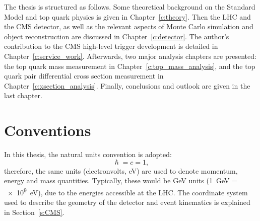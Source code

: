 The thesis is structured as follows. Some theoretical background on the Standard Model and top quark physics is given in
Chapter~\ref{c:theory}. Then the LHC and the CMS detector, as well as the relevant aspects of Monte Carlo simulation and
object reconstruction are discussed in Chapter~\ref{c:detector}. The author's contribution to the CMS high-level
trigger development is detailed in Chapter~\ref{c:service_work}. Afterwards, two major analysis chapters are presented:
the top quark mass measurement in Chapter~\ref{c:top_mass_analysis}, and the top quark pair differential cross section
measurement in Chapter~\ref{c:xsection_analysis}. Finally, conclusions and outlook are given in the last chapter.

\section*{Conventions}
In this thesis, the natural units convention is adopted:
\begin{equation*}
\hslash = c = 1,
\end{equation*}
therefore, the same units (electronvolts, \si{\eV}) are used to denote momentum, energy and mass quantities. Typically,
these would be \si{\GeV} units (\SI{1}{\GeV} = \SI{e9}{\eV}), due to the energies accessible at the LHC. The coordinate
system used to describe the geometry of the detector and event kinematics is explained in Section~\ref{s:CMS}.




